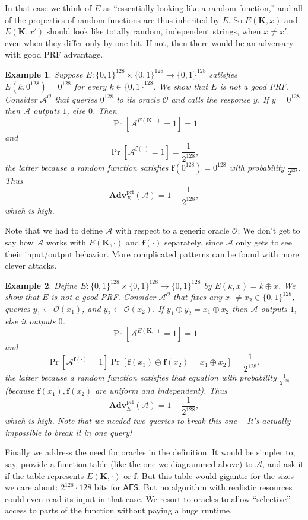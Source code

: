 \documentclass[11pt]{article}
\newtheorem{example}{Example}
\newcommand{\calA}{\mathcal{A}}
\newcommand{\AES}{\mathsf{AES}}
\newcommand{\calO}{\mathcal{O}}
\newcommand{\Adv}{\mathbf{Adv}}
\newcommand{\AdvPRF}[2]{\Adv^{\mathrm{prf}}_{#1}({#2})}
\newcommand{\bits}{\{0,1\}}
\newcommand{\bK}{\mathbf{K}}
\newcommand{\bof}{\mathbf{f}}
\begin{document}
In that case we think of $E$ as ``essentially looking like a
random function,'' and all of the properties of random functions are thus
inherited by $E$. So $E(\bK,x)$ and $E(\bK,x')$ should look like totally
random, independent strings, when $x\neq x'$, even when they differ only by one
bit. If not, then there would be an adversary with good PRF advantage.

\begin{example}
    Suppose $E:\bits^{128}\times\bits^{128}\to\bits^{128}$ satisfies
    $E(k,0^{128})=0^{128}$ for every $k\in\bits^{128}$. We show that
    $E$ is not a good PRF. Consider $\calA^\calO$ that queries $0^{128}$
    to its oracle $\calO$ and calls the response $y$. If $y=0^{128}$
    then $\calA$ outputs $1$, else $0$. Then
    \[
        \Pr[\calA^{E(\bK,\cdot)}=1]=1
    \]
    and
    \[
        \Pr[\calA^{\bof(\cdot)}=1] = \frac{1}{2^{128}},
    \]
    the latter because a random function satisfies $\bof(0^{128})=0^{128}$
    with probability $\frac{1}{2^{128}}$. Thus
    \[
        \AdvPRF{E}{\calA} = 1 - \frac{1}{2^{128}},
    \]
    which is high.
\end{example}
Note that we had to define $\calA$ with respect to a generic oracle $\calO$;
We don't get to say how $\calA$ works with $E(\bK,\cdot)$ and $\bof(\cdot)$
separately, since $\calA$ only gets to see their input/output behavior.
More complicated patterns can be found with more clever attacks.
\begin{example}
    Define $E:\bits^{128}\times\bits^{128}\to\bits^{128}$ by
    $E(k,x)=k\oplus x$.
    We show that
    $E$ is not a good PRF. Consider $\calA^\calO$ that fixes any
    $x_1\neq x_2\in\bits^{128}$, 
    queries $y_1 \gets \calO(x_1)$, and
    $y_2 \gets \calO(x_2)$. 
    If $y_1\oplus y_2 = x_1 \oplus x_2$ then $\calA$ outputs $1$, 
    else it outputs $0$.
    \[
        \Pr[\calA^{E(\bK,\cdot)}=1]=1
    \]
    and
    \[
        \Pr[\calA^{\bof(\cdot)}=1] 
        \Pr[\bof(x_1)\oplus \bof(x_2)=x_1\oplus x_2] = \frac{1}{2^{128}},
    \]
    the latter because a random function satisfies that
    equation
    with probability $\frac{1}{2^{128}}$ (because $\bof(x_1),\bof(x_2)$ are
    uniform and independent). Thus
    \[
        \AdvPRF{E}{\calA} = 1 - \frac{1}{2^{128}},
    \]
    which is high. Note that we needed two queries to break this one -- It's
    actually impossible to break it in one query!
\end{example}

Finally we address the need for oracles in the definition. It would be simpler
to, say, provide a function table (like the one we diagrammed above) to
$\calA$, and ask it if the table represents $E(\bK,\cdot)$ or $\bof$.  But this
table would gigantic for the sizes we care about: $2^{128}\cdot 128$ bits for
$\AES$. But no algorithm with realistic resources could even read its input in
that case. We resort to oracles to allow ``selective'' access to parts of
the function without paying a huge runtime.
\end{document}

